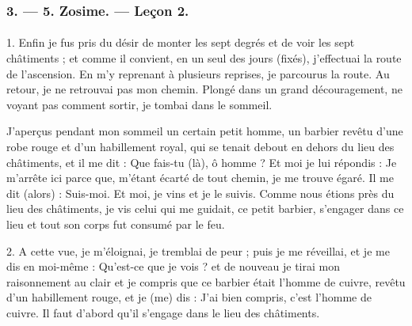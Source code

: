 \documentclass[landscape, a4paper, 11pt, oneside, polutonikogreek, french]{article}
\begin{document}
\subsubsection{3. --- 5. Zosime. --- Leçon 2.}
\paragraph{}
1. Enfin je fus pris du désir de monter les sept degrés et de voir les sept châtiments ; et comme il convient, en un seul des jours (fixés), j'effectuai la route de l'ascension. En m'y reprenant à plusieurs reprises, je parcourus la route. Au retour, je ne retrouvai pas mon chemin. Plongé dans un grand découragement, ne voyant pas comment sortir, je tombai dans le sommeil.

J'aperçus pendant mon sommeil un certain petit homme, un barbier revêtu d'une robe rouge et d'un habillement royal, qui se tenait debout en dehors du lieu des châtiments, et il me dit : Que fais-tu (là), ô homme ? Et moi je lui répondis : Je m'arrête ici parce que, m'étant écarté de tout chemin, je me trouve égaré. Il me dit (alors) : Suis-moi. Et moi, je vins et je le suivis. Comme nous étions près du lieu des châtiments, je vis celui qui me guidait, ce petit barbier, s'engager dans ce lieu et tout son corps fut consumé par le feu.

2. A cette vue, je m'éloignai, je tremblai de peur ; puis je me réveillai, et je me dis en moi-même : Qu'est-ce que je vois ? et de nouveau je tirai mon raisonnement au clair et je compris que ce barbier était l'homme de cuivre, revêtu d'un habillement rouge, et je (me) dis : J'ai bien compris, c'est l'homme de cuivre. Il faut d'abord qu'il s'engage dans le lieu des châtiments.
\end{document}
